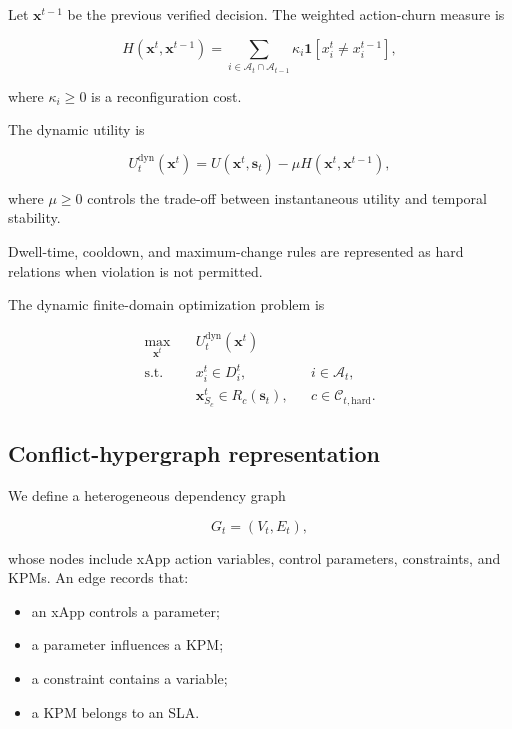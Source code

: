 \documentclass[pdflatex,sn-mathphys-num,iicol,oneside]{sn-jnl}
\begin{document}
Let $\bm{x}^{t-1}$ be the previous verified decision. The weighted
action-churn measure is

\begin{equation}
H(\bm{x}^{t},\bm{x}^{t-1})
=
\sum_{i\in\mathcal{A}_t\cap\mathcal{A}_{t-1}}
\kappa_i
\mathbf{1}
\left[
x_i^t\neq x_i^{t-1}
\right],
\label{eq:churn}
\end{equation}

where $\kappa_i\geq 0$ is a reconfiguration cost.

The dynamic utility is

\begin{equation}
U_t^{\mathrm{dyn}}(\bm{x}^{t})
=
U(\bm{x}^{t},\bm{s}_t)
-
\mu
H(\bm{x}^{t},\bm{x}^{t-1}),
\label{eq:dynamic-utility}
\end{equation}

where $\mu\geq 0$ controls the trade-off between instantaneous utility
and temporal stability.

Dwell-time, cooldown, and maximum-change rules are represented as hard
relations when violation is not permitted.

The dynamic finite-domain optimization problem is

\begin{align}
\max_{\bm{x}^{t}}\quad&
U_t^{\mathrm{dyn}}(\bm{x}^{t})
\label{eq:problem-objective}\\
\text{s.t.}\quad&
x_i^t\in D_i^t,
&&i\in\mathcal{A}_t,
\label{eq:problem-domain}\\
&
\bm{x}_{S_c}^t\in R_c(\bm{s}_t),
&&c\in\mathcal{C}_{t,\mathrm{hard}}.
\label{eq:problem-hard}
\end{align}

\subsection{Conflict-hypergraph representation}

We define a heterogeneous dependency graph

\begin{equation}
G_t=(V_t,E_t),
\end{equation}

whose nodes include xApp action variables, control parameters,
constraints, and KPMs. An edge records that:

\begin{itemize}
    \item an xApp controls a parameter;
    \item a parameter influences a KPM;
    \item a constraint contains a variable;
    \item a KPM belongs to an SLA.
\end{itemize}
\end{document}
